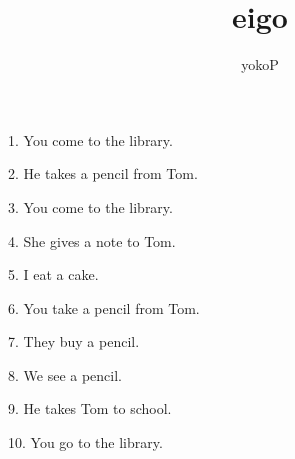 \documentclass[uplatex,
paper=a4,
fontsize=18pt,
jafontsize=16pt,
number_of_lines=30,
line_length=30zh,
baselineskip=25pt,
]{jlreq}
\author{yokoP}
\title{eigo}
\begin{document}
1.  You come to the library.

2.  He takes a pencil from Tom.

3.  You come to the library.

4.  She gives a note to Tom.

5.  I eat a cake.

6.  You take a pencil from Tom.

7.  They buy a pencil.

8.  We see a pencil.

9.  He takes Tom to school.

10.  You go to the library.
\end{document}
